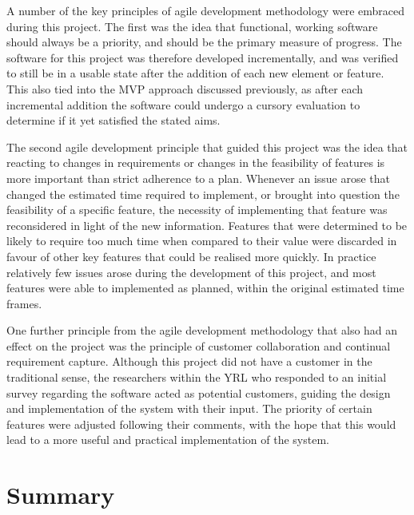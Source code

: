 A number of the key principles of agile development methodology were embraced during this project. The first was the idea that functional, working software should always be a priority, and should be the primary measure of progress. The software for this project was therefore developed incrementally, and was verified to still be in a usable state after the addition of each new element or feature. This also tied into the MVP approach discussed previously, as after each incremental addition the software could undergo a cursory evaluation to determine if it yet satisfied the stated aims. 

The second agile development principle that guided this project was the idea that reacting to changes in requirements or changes in the feasibility of features is more important than strict adherence to a plan. Whenever an issue arose that changed the estimated time required to implement, or brought into question the feasibility of a specific feature, the necessity of implementing that feature was reconsidered in light of the new information. Features that were determined to be likely to require too much time when compared to their value were discarded in favour of other key features that could be realised more quickly. In practice relatively few issues arose during the development of this project, and most features were able to implemented as planned, within the original estimated time frames.

One further principle from the agile development methodology that also had an effect on the project was the principle of customer collaboration and continual requirement capture. Although this project did not have a customer in the traditional sense, the researchers within the YRL who responded to an initial survey regarding the software acted as potential customers, guiding the design and implementation of the system with their input. The priority of certain features were adjusted following their comments, with the hope that this would lead to a more useful and practical implementation of the system.


\section{Summary}

